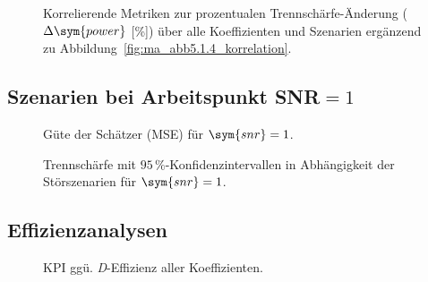 \begin{figure}[htbp]
    \centering
    \setlength{}
    \setlength\figureheight{19cm}
    
    \caption{Korrelierende Metriken zur prozentualen Trennschärfe-Änderung ($\Delta \sym{power}$ [\%]) über alle Koeffizienten und Szenarien ergänzend zu Abbildung~\ref{fig:ma_abb5.1.4_korrelation}.}
    \label{fig:app.c_corr_all}
\end{figure}

\clearpage
\subsection{Szenarien bei Arbeitspunkt \ac{SNR}$=1$} \label{app:c_snr1}

\begin{figure}[htbp]
    \centering
    \setlength{}
    \setlength\figureheight{4cm}
    
    \caption{Güte der Schätzer (\ac{MSE}) für $\sym{snr}=1$.}
    \label{fig:app.c_msedev_snr1}
\end{figure}

\begin{figure}[htbp]
    \centering
    \setlength{}
    \setlength\figureheight{4cm}
    
    \caption{Trennschärfe mit $95\,\%$-Konfidenzintervallen in Abhängigkeit der Störszenarien für $\sym{snr}=1$.}
    \label{fig:app.c_powerdev_snr1}
\end{figure}


\subsection{Effizienzanalysen} \label{app:c_effizienz}

\begin{figure}[htbp]
    \centering
    \setlength{}
    \setlength\figureheight{16cm}
    
    \caption{\ac{KPI} ggü. \textit{D}-Effizienz aller Koeffizienten.}
    \label{fig:app.c_kpi_all_coeffs}
\end{figure}
